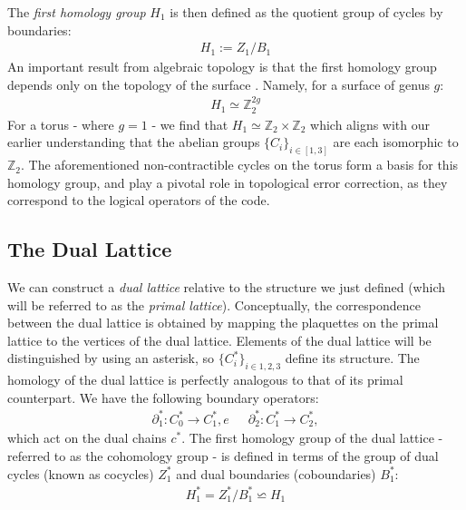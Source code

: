 \documentclass[12pt]{article}
\theoremstyle{definition}
\begin{document}
The \emph{first homology group} $H_1$ is then defined as the quotient group of cycles by boundaries:
    \begin{align}
        H_1 := Z_1 / B_1
    \end{align}
An important result from algebraic topology is that the first homology group depends only on the topology of the surface \cite{anintro}. Namely, for a surface of genus $g$:
    \begin{align}
        H_1 \simeq \mathbb{Z}^{2g}_2
    \end{align}
For a torus - where $g = 1$ -  we find that $H_1\simeq \mathbb{Z}_2\times\mathbb{Z}_2$ which aligns with our earlier understanding that the abelian groups $\{C_i\}_{i\in [1,3]}$ are each isomorphic to $\mathbb{Z}_2$. The aforementioned non-contractible cycles on the torus form a basis for this homology group, and play a pivotal role in topological error correction, as they correspond to the logical operators of the code.

\subsection{The Dual Lattice}
We can construct a \emph{dual lattice} relative to the structure we just defined (which will be referred to as the \emph{primal lattice}). Conceptually, the correspondence between the dual lattice is obtained by mapping the plaquettes on the primal lattice to the vertices of the dual lattice. Elements of the dual lattice will be distinguished by using an asterisk, so $\{C^*_i\}_{i\in{1,2,3}}$ define its structure. The homology of the dual lattice is perfectly analogous to that of its primal counterpart. We have the following boundary operators:
    \begin{align}
        \partial^*_1:C^*_0\rightarrow C^*_1,e\enspace\enspace\enspace\partial^*_2:C^*_1\rightarrow C^*_2,
    \end{align}
which act on the dual chains $c^*$. The first homology group of the dual lattice - referred to as the cohomology group - is defined in terms of the group of dual cycles (known as cocycles) $Z^*_1$ and dual boundaries (coboundaries) $B^*_1$:
    \begin{align}
        H^*_1 = Z^*_1/B^*_1\backsimeq H_1
    \end{align}
\end{document}
